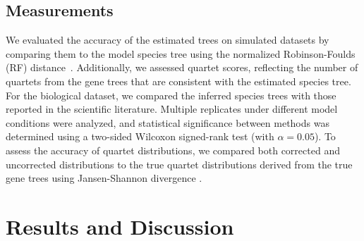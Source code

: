 \documentclass[runningheads]{llncs}
\begin{document}
\subsection{Measurements}

We evaluated the accuracy of the estimated trees on simulated datasets by comparing them to the model species tree using the normalized Robinson-Foulds (RF) distance~\cite{robinson_comparison_1981}.%
Additionally, we assessed quartet scores, reflecting the number of quartets from the gene trees that are consistent with the estimated species tree. %
For the biological dataset, we compared the inferred species trees with those reported in the scientific literature. Multiple replicates under different model conditions were analyzed, and statistical significance between methods was determined using a two-sided Wilcoxon signed-rank test (with $\alpha = 0.05$). To assess the accuracy of quartet distributions, we compared both corrected and uncorrected distributions to the true quartet distributions derived from the true gene trees using Jansen-Shannon divergence \cite{fuglede2004jensen}.


\section{Results and Discussion}
\end{document}
